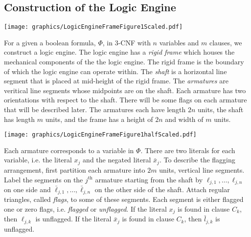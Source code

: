 \documentclass[10pt]{CSUNthesis}
\theoremstyle{plain}%
\theoremstyle{definition}
\theoremstyle{remark}
\begin{document}
\subsection{Construction of the Logic Engine}

\begin{minipage}{\linewidth}
\begin{center}
\texttt{[image: graphics/LogicEngineFrameFigure1Scaled.pdf]}
\label{fig:LogicEngineFrameFigure1.pdf}
\end{center}
\end{minipage}

For a given a boolean formula, $\Phi$, in 3-CNF with $n$ variables and $m$ clauses, we construct a logic engine. The logic engine has a \textit{rigid frame} which houses the mechanical components of the the logic engine.  The rigid frame is the boundary of which the logic engine can operate within.  The \textit{shaft} is a horizontal line segment that is placed at mid-height of the rigid frame. 
The \textit{armatures} are veritical line segments whose midpoints are on the shaft.  
Each armature has two orientations with respect to the shaft. 
There will be some flags on each armature that will be described later.
The armatures each have length $2n$ units, the shaft has length $m$ units, and the frame has a height of $2n$ and width of $m$ units.

\begin{minipage}{\linewidth}
\begin{center}
\texttt{[image: graphics/LogicEngineFrameFigure1halfScaled.pdf]}
\label{fig:LogicEngineFrameFigure1halfScaled.pdf}
\end{center}
\end{minipage}

  Each armature corresponds to a variable in $\Phi$. There are two literals for each variable, i.e. the literal $x_j$ and the negated literal 
 $\bar{x}_j$.    
 To describe the flagging arrangement, first partition each armature into $2m$ units, vertical line segments. Label the segments on the $j^\text{th}$ armature starting from the shaft by $\ell_{j,1},\ldots,\ell_{j,n}$ on one side and  $\bar{\ell}_{j,1},\ldots,\bar{\ell}_{j,n}$ on the other side of the shaft.  
 Attach regular triangles, called \textit{flags}, to some of these segments. 
 Each segment is either flagged one or zero flags, i.e. \textit{flagged} or \textit{unflagged}. If the literal $x_j$ is found in clause $C_k$, then $\ell_{j,k}$ is unflagged.
   If the literal $\bar{x}_j$ is found in clause $C_k$, then $\bar{l}_{j,k}$ is unflagged.
\end{document}

